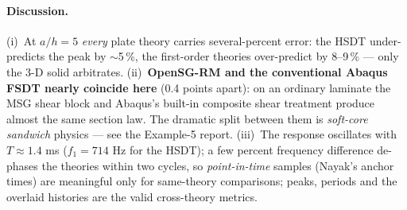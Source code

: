 \documentclass[11pt]{article}
\begin{document}
\paragraph{Discussion.}
(i)~At $a/h=5$ \emph{every} plate theory carries several-percent error:
the HSDT under-predicts the peak by $\sim$5\,\%, the first-order theories
over-predict by 8--9\,\% --- only the 3-D solid arbitrates.
(ii)~\textbf{OpenSG-RM and the conventional Abaqus FSDT nearly coincide
here} (0.4 points apart): on an ordinary laminate the MSG shear block and
Abaqus's built-in composite shear treatment produce almost the same
section law.  The dramatic split between them is \emph{soft-core sandwich}
physics --- see the Example-5 report.
(iii)~The response oscillates with $T\approx1.4$ ms ($f_1=714$ Hz for the
HSDT); a few percent frequency difference de-phases the theories within
two cycles, so \emph{point-in-time} samples (Nayak's anchor times) are
meaningful only for same-theory comparisons; peaks, periods and the
overlaid histories are the valid cross-theory metrics.
\end{document}

